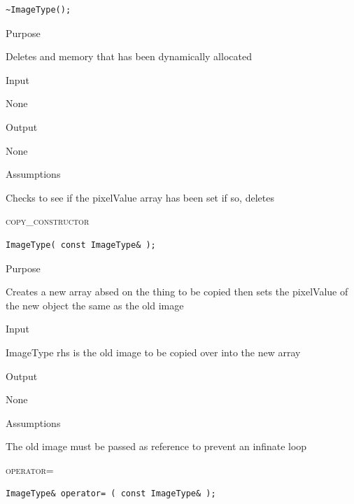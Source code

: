 \documentclass[pdftex, 11pt]{article}
\begin{document}
\begin{description}
\begin{description}
\begin{lstlisting}
~ImageType();
\end{lstlisting}

			\item{Purpose}

				Deletes and memory that has been dynamically allocated

			\item{Input}

				None

			\item{Output}

				None

			\item{Assumptions}

				Checks to see if the pixelValue array has been set
				if so, deletes

		\end{description}


	\item{\textsc{copy\_constructor}}
		\begin{description}

\begin{lstlisting}
ImageType( const ImageType& );
\end{lstlisting}

			\item{Purpose}
		
				Creates a new array absed on the thing to be copied
				then sets the pixelValue of the new object the same as
				the old image

			\item{Input}

				ImageType rhs is the old image to be copied over into
				the new array


			\item{Output}

				None

			\item{Assumptions}

				The old image must be passed as reference to prevent
				an infinate loop


		\end{description}


	\item{\textsc{operator=}}
		\begin{description}

\begin{lstlisting}
ImageType& operator= ( const ImageType& );
\end{lstlisting}


\end{description}
\end{description}
\end{document}
